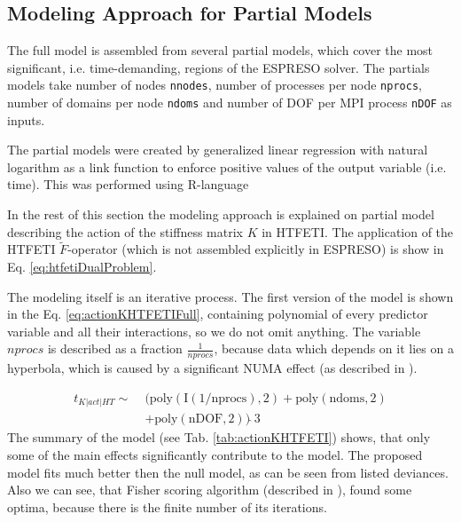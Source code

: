 \subsection{Modeling Approach for Partial Models}

The full model is assembled from several partial models, which cover the most 
significant, i.e. time-demanding, regions of the ESPRESO solver. The partials models take
number of nodes \verb!nnodes!, number of processes per node \verb!nprocs!,
number of domains per node \verb!ndoms! and number of DOF per MPI process \verb!nDOF!
as inputs.

The partial models were created by generalized linear regression with natural logarithm as a link function to enforce positive values of the output variable (i.e. time). This was performed using R-language \cite{rDocs}

In the rest of this section the modeling approach is explained on partial model describing the action of the stiffness matrix $K$ in HTFETI. The application of the HTFETI $\tilde{F}$-operator (which is not assembled explicitly in ESPRESO) is show in Eq. \eqref{eq:htfetiDualProblem}. 

The modeling itself is an iterative process. The first version of the model is shown in the Eq. \eqref{eq:actionKHTFETIFull}, containing 
polynomial of every predictor variable and all their interactions, so we do not omit anything. The variable $nprocs$ is described as a fraction $\frac{1}{nprocs}$, because data which depends on it lies on a hyperbola, which is caused by a significant NUMA effect (as described in \cite{molka2015cache}).


\begin{equation}
\label{eq:actionKHTFETIFull}
\begin{aligned}
t_{K|act|HT} \sim\; &\mathrm{(poly(I(1/nprocs), 2) + poly(ndoms, 2)}\\
&+ \mathrm{poly(nDOF, 2))\,\widehat{}\,3}
\end{aligned}
\end{equation}
The summary of the model (see Tab. \ref{tab:actionKHTFETI}) shows, that only some of the main effects  significantly contribute to the model. The proposed model fits much better then the null model, as can be seen from listed deviances. 
Also we can see, that Fisher scoring algorithm (described in \cite{fischerScoringAlg}), 
found some optima, because there is the finite number of its iterations.


